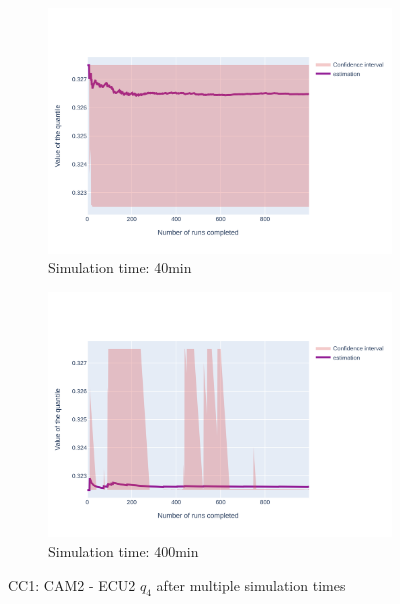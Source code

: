 \documentclass{article}
\begin{document}
\begin{figure}[H]
\begin{subfigure}{.495\textwidth}
        \vspace{.5cm}
    \end{subfigure}
    \begin{subfigure}{.495\textwidth}
        \centering
        \includegraphics[width=\textwidth]{../fig/quantile4/CC1: CAM2 --> ECU2_40mn.png}
        \caption{Simulation time: 40min}
    \end{subfigure}
    \begin{subfigure}{.495\textwidth}
        \centering
        \includegraphics[width=\textwidth]{../fig/quantile4/CC1: CAM2 --> ECU2_400mn.png}
        \caption{Simulation time: 400min}
    \end{subfigure}
    \caption{CC1: CAM2 - ECU2 $q_4$ after multiple simulation times}
\end{figure}
\end{document}
